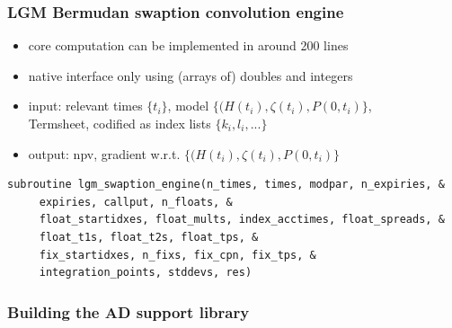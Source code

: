\documentclass[10pt,German]{beamer}
\begin{document}
\begin{frame}[fragile]
\frametitle{LGM Bermudan swaption convolution engine}
\begin{itemize}
\item core computation can be implemented in around 200 lines
\item native interface only using (arrays of) doubles and integers
\item input: relevant times $\{t_i\}$, model $\{(H(t_i), \zeta(t_i), P(0,t_i)\}$,\\
Termsheet, codified as index lists $\{k_i, l_i, ...\}$
\item output: npv, gradient w.r.t. $\{(H(t_i), \zeta(t_i), P(0,t_i)\}$
\end{itemize}
\begin{verbatim}
subroutine lgm_swaption_engine(n_times, times, modpar, n_expiries, &
     expiries, callput, n_floats, &
     float_startidxes, float_mults, index_acctimes, float_spreads, &
     float_t1s, float_t2s, float_tps, &
     fix_startidxes, n_fixs, fix_cpn, fix_tps, &
     integration_points, stddevs, res)
\end{verbatim}
\end{frame}

\begin{frame}[fragile]
\frametitle{Building the AD support library}
\end{frame}
\end{document}
